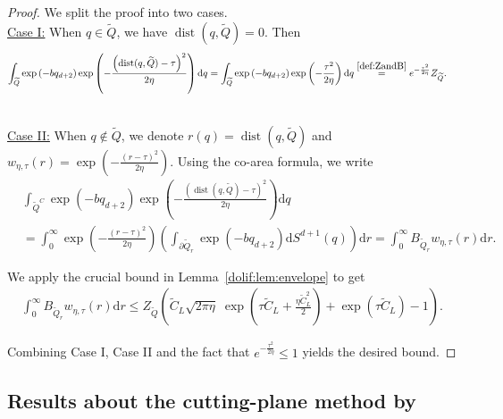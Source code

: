 \documentclass[11pt,letterpaper]{article}
\newcommand{\Q}{\widetilde{Q}}
\newcommand{\dist}{\operatorname{dist}}
\newcommand{\D}{\mathrm{d}}
\newcommand{\brac}[1]{\left( #1\right)}
\begin{document}
\begin{proof}   We split the proof into two cases. 
~\\
\underline{Case I:} When $q\in \Q$, we have $\dist(q,\Q)=0$. Then
\begin{align*}
    \int_{\Q} \exp\brac{-bq_{d+2}} \exp\brac{-\frac{\brac{\dist (q,\Q)-\tau}^2}{2\eta}}\D q
    &=\int_{\Q} \exp\brac{-bq_{d+2}} \exp\brac{-\frac{\tau^2}{2\eta}}   \D q \stackrel{\eqref{def:ZandB}}{=} e^{-\frac{\tau^2}{2\eta}} Z_{\Q}.
\end{align*}

~\\
\underline{Case II:} When $q \notin \Q$, we denote $r(q) = \dist(q,\Q)$ and $w_{\eta,\tau}(r) = \exp\brac{-\frac{(r-\tau)^2}{2\eta}}$. Using the co-area formula, we write
\begin{align*}
    &\int_{\Q^C} \exp\brac{-bq_{d+2}} \exp\brac{-\frac{\brac{\dist (q,\Q)-\tau}^2}{2\eta}}\D q\\
    &=\int_0^\infty \exp\brac{-\frac{(r-\tau)^2}{2\eta}}\left(\int_{\partial \Q_r}\exp\brac{-bq_{d+2}}\D S^{d+1}(q)\right)\D r = \int_0^\infty B_{\Q_r} w_{\eta,\tau}(r) \D r.
\end{align*}


We apply the crucial bound in Lemma~\ref{dolif:lem:envelope} to get
\begin{align*}
    \int_0^\infty B_{\Q_r} w_{\eta,\tau}(r) \D r\le  Z_{\Q} \brac{\widetilde{C}_L\sqrt{2\pi\eta}\;\exp\brac{\tau \widetilde{C}_L + \frac{\eta \widetilde{C}_L^2}{2}}+\exp(\tau \widetilde{C}_L)-1}.
\end{align*}

Combining Case I, Case II and the fact that $e^{-\frac{\tau^2}{2\eta}} \leq 1$  yields the desired bound. 
\end{proof}










\subsection{Results about the cutting-plane method by \cite{jiang2020cuttingplane}}
\label{dolif:appen:cuttingplane}
\end{document}
